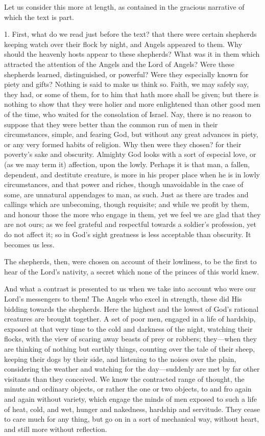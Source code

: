 Let us consider this more at length, as contained in the gracious
narrative of which the text is part.

1. First, what do we read just before the text? that there were
certain shepherds keeping watch over their flock by night, and Angels
appeared to them. Why should the heavenly hosts appear to these
shepherds? What was it in them which attracted the attention of the
Angels and the Lord of Angels? Were these shepherds learned,
distinguished, or powerful? Were they especially known for piety and
gifts? Nothing is said to make us think so. Faith, we may safely say,
they had, or some of them, for to him that hath more shall be given;
but there is nothing to show that they were holier and more
enlightened than other good men of the time, who waited for the
consolation of Israel. Nay, there is no reason to suppose that they
were better than the common run of men in their circumstances, simple,
and fearing God, but without any great advances in piety, or any very
formed habits of religion. Why then were they chosen? for their
poverty's sake and obscurity. Almighty God looks with a sort of
especial love, or (as we may term it) affection, upon the lowly.
Perhaps it is that man, a fallen, dependent, and destitute creature,
is more in his proper place when he is in lowly circumstances, and
that power and riches, though unavoidable in the case of some, are
unnatural appendages to man, as such. Just as there are trades and
callings which are unbecoming, though requisite; and while we profit
by them, and honour those the more who engage in them, yet we feel we
are glad that they are not ours; as we feel grateful and respectful
towards a soldier's profession, yet do not affect it; so in God's
sight greatness is less acceptable than obscurity. It becomes us less.

The shepherds, then, were chosen on account of their lowliness, to
be the first to hear of the Lord's nativity, a secret which none of
the princes of this world knew.

And what a contrast is presented to us when we take into account
who were our Lord's messengers to them! The Angels who excel in
strength, these did His bidding towards the shepherds. Here the
highest and the lowest of God's rational creatures are brought
together. A set of poor men, engaged in a life of hardship, exposed at
that very time to the cold and darkness of the night, watching their
flocks, with the view of scaring away beasts of prey or robbers; they—when
they are thinking of nothing but earthly things, counting over the
tale of their sheep, keeping their dogs by their side, and listening
to the noises over the plain, considering the weather and watching for
the day—suddenly are met by far other visitants than they conceived.
We know the contracted range of thought, the minute and ordinary
objects, or rather the one or two objects, to and fro again and again
without variety, which engage the minds of men exposed to such a life
of heat, cold, and wet, hunger and nakedness, hardship and servitude.
They cease to care much for any thing, but go on in a sort of
mechanical way, without heart, and still more without reflection.

